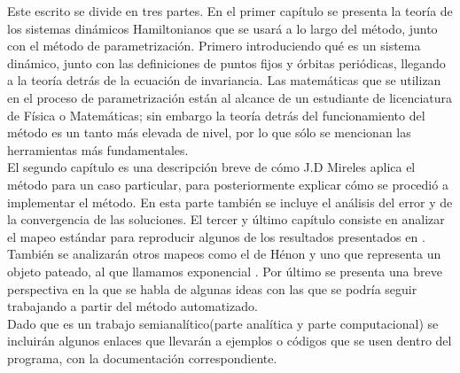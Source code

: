Este escrito se divide en tres partes. En el primer capítulo se presenta la teoría de los sistemas dinámicos Hamiltonianos que se usará a lo largo del método, junto con el método de parametrización. Primero introduciendo qué es un sistema dinámico, junto con las definiciones de puntos fijos y órbitas periódicas, llegando a la teoría detrás de la ecuación de invariancia. Las matemáticas que se utilizan en el proceso de parametrización están al alcance de un estudiante de licenciatura de Física o Ma\-te\-má\-ti\-cas; sin embargo la teoría detrás del funcionamiento del método es un tanto más elevada de nivel, por lo que sólo se mencionan las herramientas más fundamentales.  \\


El segundo capítulo es una descripción breve de cómo J.D Mireles aplica el método para un caso particular, para posteriormente explicar cómo se procedió a implementar el método. En esta parte también se incluye el análisis del error y de la convergencia de las soluciones. El tercer y último capítulo consiste en analizar el mapeo estándar para reproducir algunos de los resultados presentados en \cite{Mireles}. También se analizarán otros mapeos como el de Hénon y uno que representa un objeto pateado, al que llamamos exponencial \cite{Jung}. Por último se presenta una breve perspectiva en la que se habla de algunas ideas con las que se podría seguir trabajando a partir del método automatizado. \\

Dado que es un trabajo semianalítico(parte analítica y parte computacional) se incluirán algunos enlaces que llevarán a ejemplos o códigos que se usen dentro del programa, con la documentación correspondiente. 


